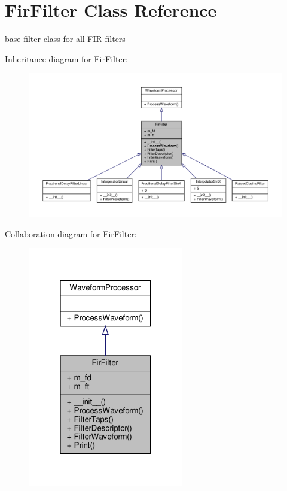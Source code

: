 \hypertarget{classSignalIntegrity_1_1TimeDomain_1_1Filters_1_1FirFilter_1_1FirFilter}{}\section{Fir\+Filter Class Reference}
\label{classSignalIntegrity_1_1TimeDomain_1_1Filters_1_1FirFilter_1_1FirFilter}


base filter class for all F\+IR filters  




Inheritance diagram for Fir\+Filter\+:\nopagebreak
\begin{figure}[H]
\begin{center}
\leavevmode
\includegraphics[width=350pt]{classSignalIntegrity_1_1TimeDomain_1_1Filters_1_1FirFilter_1_1FirFilter__inherit__graph}
\end{center}
\end{figure}


Collaboration diagram for Fir\+Filter\+:\nopagebreak
\begin{figure}[H]
\begin{center}
\leavevmode
\includegraphics[width=193pt]{classSignalIntegrity_1_1TimeDomain_1_1Filters_1_1FirFilter_1_1FirFilter__coll__graph}
\end{center}
\end{figure}
